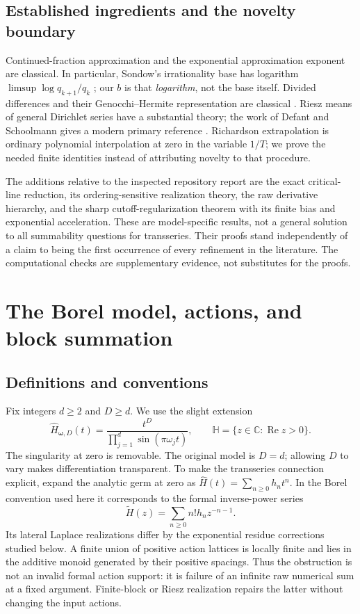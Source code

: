 \documentclass[11pt,a4paper]{article}
\numberwithin{equation}{section}
\theoremstyle{definition}
\theoremstyle{remark}
\newcommand{\C}{\mathbb C}
\newcommand{\re}{\operatorname{Re}}
\newcommand{\Hh}{\mathbb H}
\begin{document}
\subsection{Established ingredients and the novelty boundary}
Continued-fraction approximation and the exponential approximation
exponent are classical. In particular, Sondow's irrationality base has
logarithm $\limsup\log q_{k+1}/q_k$ \cite{sondow}; our $b$ is that
\emph{logarithm}, not the base itself. Divided differences and their
Genocchi--Hermite representation are classical \cite{deboor}. Riesz means
of general Dirichlet series have a substantial theory; the work of
Defant and Schoolmann gives a modern primary reference
\cite{defant-schoolmann}. Richardson extrapolation is ordinary polynomial
interpolation at zero in the variable $1/T$; we prove the needed finite
identities instead of attributing novelty to that procedure.

The additions relative to the inspected repository report are the exact
critical-line reduction, its ordering-sensitive realization theory, the
raw derivative hierarchy, and the sharp cutoff-regularization theorem
with its finite bias and exponential acceleration. These are
model-specific results, not a general solution to all summability
questions for transseries. Their proofs stand independently of a claim
to being the first occurrence of every refinement in the literature.
The computational checks are supplementary evidence, not substitutes
for the proofs.

\section{The Borel model, actions, and block summation}
\label{sec:model}

\subsection{Definitions and conventions}
Fix integers $d\ge2$ and $D\ge d$. We use the slight extension
\begin{equation}
 \widehat H_{\boldsymbol\omega,D}(t)
  =\frac{t^D}{\prod_{j=1}^d\sin(\pi\omega_jt)},\qquad
 \Hh=\{z\in\C:\re z>0\}.
 \label{eq:kernel}
\end{equation}
The singularity at zero is removable. The original model is $D=d$;
allowing $D$ to vary makes differentiation transparent. To make the
transseries connection explicit, expand the analytic germ at zero as
$\widehat H(t)=\sum_{n\ge0}h_nt^n$. In the Borel convention used here it
corresponds to the formal inverse-power series
\begin{equation}
 \widetilde H(z)=\sum_{n\ge0}n!h_nz^{-n-1}.
 \label{eq:formal-borel}
\end{equation}
Its lateral Laplace realizations differ by the exponential residue
corrections studied below. A finite union of positive action lattices
is locally finite and lies in the additive monoid generated by their
positive spacings. Thus the obstruction is not an invalid formal action
support: it is failure of an infinite raw numerical sum at a fixed
argument. Finite-block or Riesz realization repairs the latter without
changing the input actions.
\end{document}
